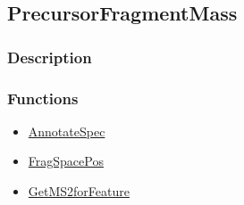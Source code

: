 \subsection{PrecursorFragmentMass}\label{PrecursorFragmentMass}
\subsubsection{Description}


\subsubsection{Functions}
\begin{itemize}
\item \hyperref[AnnotateSpec]{AnnotateSpec}
\item \hyperref[FragSpacePos]{FragSpacePos}
\item \hyperref[GetMS2forFeature]{GetMS2forFeature}
\end{itemize}

